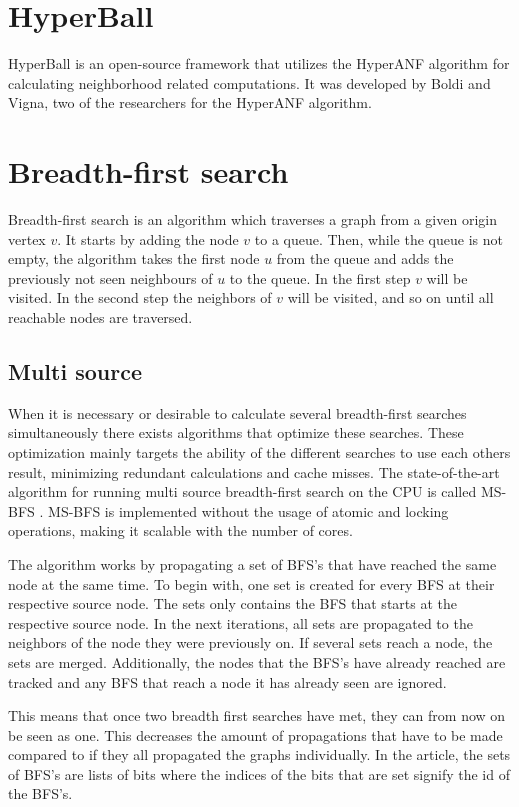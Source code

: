 \section{HyperBall}
HyperBall is an open-source framework that utilizes the HyperANF algorithm for calculating neighborhood related computations. It was developed by Boldi and Vigna, two of the researchers for the HyperANF algorithm.

\section{Breadth-first search}

Breadth-first search is an algorithm which traverses a graph from a given origin vertex $v$. It starts by adding the node $v$ to a queue. Then, while the queue is not empty, the algorithm takes the first node $u$ from the queue and adds the previously not seen neighbours of $u$ to the queue. In the first step $v$ will be visited. In the second step the neighbors of $v$ will be visited, and so on until all reachable nodes are traversed.

\subsection{Multi source}
When it is necessary or desirable to calculate several breadth-first searches simultaneously there exists algorithms that optimize these searches. These optimization mainly targets the ability of the different searches to use each others result, minimizing redundant calculations and cache misses. The state-of-the-art algorithm for running multi source breadth-first search on the CPU is called MS-BFS \cite{msbfs}. MS-BFS is implemented without the usage of atomic and locking operations, making it scalable with the number of cores. 

The algorithm works by propagating a set of BFS's that have reached the same node at the same time. To begin with, one set is created for every BFS at their respective source node. The sets only contains the BFS that starts at the respective source node. In the next iterations, all sets are propagated to the neighbors of the node they were previously on. If several sets reach a node, the sets are merged. Additionally, the nodes that the BFS's have already reached are tracked and any BFS that reach a node it has already seen are ignored. 

This means that once two breadth first searches have met, they can from now on be seen as one. This decreases the amount of propagations that have to be made compared to if they all propagated the graphs individually. In the article, the sets of BFS's are lists of bits where the indices of the bits that are set signify the id of the BFS's.

